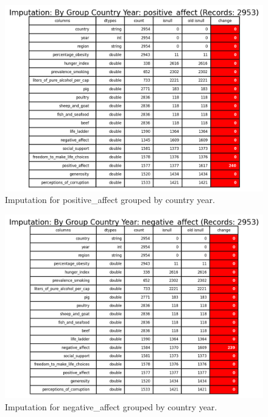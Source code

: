                 \begin{figure}[H]
                        \centering
                        \includegraphics[scale=1]{images/dp_imputation_c_y_positive_affect}
                        \caption{Imputation for positive\_affect grouped by country year.}
                        \label{fig:dp-impute-group-country-positive-affect}
                \end{figure}

                \begin{figure}[H]
                        \centering
                        \includegraphics[scale=1]{images/dp_imputation_c_y_negative_affect}
                        \caption{Imputation for negative\_affect grouped by country year.}
                        \label{fig:dp-impute-group-country-negative-affect}
                \end{figure}

